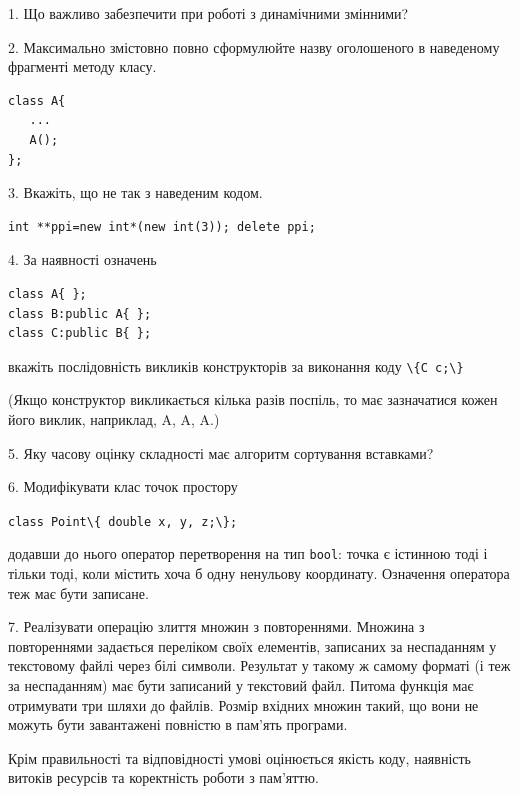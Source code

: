\documentclass[12pt, ukrainian]{article}
\def\code#1{\Verb!#1!}
\begin{document}
{%
1. Що важливо забезпечити при роботі з динамічними змінними?%
\par
\vspace{2mm}
2. Максимально змістовно повно сформулюйте назву оголошеного в наведеному фрагменті методу класу.
\vspace{-3mm}
\begin{verbatim}class A{
   ...
   A();
};\end{verbatim}
\vspace{-3mm}
\par
\vspace{2mm}
3. Вкажіть, що не так з наведеним кодом.
\vspace{-3mm}
\begin{verbatim}int **ppi=new int*(new int(3)); delete ppi;\end{verbatim}
\vspace{-3mm}
\par
\vspace{2mm}
4. За наявності означень
\vspace{-3mm}
\begin{verbatim}
class A{ };
class B:public A{ };
class C:public B{ };\end{verbatim}
\vspace{-3mm}
вкажіть послідовність викликів конструкторів за виконання коду \code{\{C c;\}} 

(Якщо конструктор викликається кілька разів поспіль, то має зазначатися кожен його виклик, наприклад, A, A, A.)

\vspace{2mm}
5. Яку часову оцінку складності має алгоритм сортування вставками?
\par
\vspace{2mm}
6. Модифікувати клас точок простору 

\qquad\code{class Point\{ double x, y, z;\};}


додавши до нього оператор перетворення на тип \code{bool}: точка є істинною тоді і тільки тоді, коли містить хоча б одну ненульову координату. Означення оператора теж має бути записане.%
\par
\vspace{2mm}
7. 
Реалізувати операцію злиття множин з повтореннями. Множина з повтореннями задається переліком своїх елементів, записаних за неспаданням у текстовому файлі через білі символи. Результат у такому ж самому форматі (і теж за неспаданням) має бути записаний у текстовий файл. Питома функція має отримувати три шляхи до файлів. Розмір вхідних множин такий, що вони не можуть бути завантажені повністю в пам’ять програми.

Крім правильності та відповідності умові оцінюється якість коду, наявність витоків ресурсів та коректність роботи з пам'яттю. 

}
\end{document}
